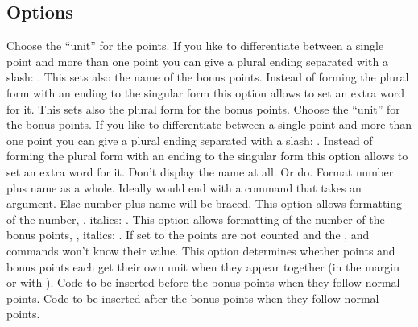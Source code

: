 \documentclass[load-preamble+,scrartcl={DIV10}]{cnltx-doc}
\begin{document}
\subsection{Options}
\begin{options}
    Choose the ``unit'' for the points.  If you like to differentiate between
    a single point and more than one point you can give a plural ending
    separated with a slash: .  This sets also the name of
    the bonus points.
  \Default
    Instead of forming the plural form with an ending to the singular form
    this option allows to set an extra word for it.  This sets also the plural
    form for the bonus points.
    Choose the ``unit'' for the bonus points.  If you like to differentiate
    between a single point and more than one point you can give a plural
    ending separated with a slash: .
  \Default
    Instead of forming the plural form with an ending to the singular form
    this option allows to set an extra word for it.
    Don't display the name at all.  Or do.
    Format number plus name as a whole.  Ideally
     would end with a command that takes an argument.  Else
    number plus name will be braced.
  \Default
    This option allows formatting of the number, \eg, italics:
    .
  \Default
    This option allows formatting of the number of the bonus points, \eg,
    italics: .
    If set to  the points are not counted and the
    ,  and  commands won't know
    their value.
    This option determines whether points and bonus points each get their own
    unit when they appear together (in the margin or with ).
    Code to be inserted before the bonus points when they follow normal
    points.
  \Default{)}
    Code to be inserted after the bonus points when they follow normal
    points.
\end{options}
\end{document}
